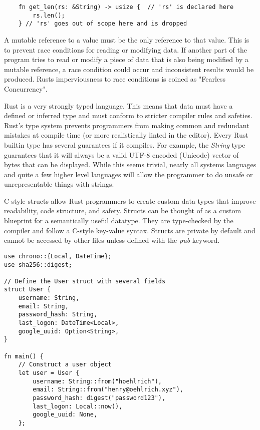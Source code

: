 \documentclass[12pt]{article}
\begin{document}
\begin{flushleft}
\begin{verbatim}
    fn get_len(rs: &String) -> usize {  // 'rs' is declared here
        rs.len();
    } // 'rs' goes out of scope here and is dropped
\end{verbatim}
\doublespacing{}

A mutable reference to a value must be the only reference to that value. This
is to prevent race conditions for reading or modifying data. If another part of
the program tries to read or modify a piece of data that is also being modified
by a mutable reference, a race condition could occur and inconsistent results
would be produced. Rusts imperviousness to race conditions is coined as
"Fearless Concurrency". 


Rust is a very strongly typed language. This means that data must have a
defined or inferred type and must conform to stricter compiler rules and
safeties. Rust's type system prevents programmers from making common and
redundant mistakes at compile time (or more realistically linted in the
editor). Every Rust builtin type has several guarantees if it compiles. For
example, the \textit{String} type guarantees that it will always be a valid
UTF-8 encoded (Unicode) vector of bytes that can be displayed. While this seems
trivial, nearly all systems languages and quite a few higher level languages
will allow the programmer to do unsafe or unrepresentable things with strings.


C-style structs allow Rust programmers to create custom data types that improve
readability, code structure, and safety. Structs can be thought of as a custom
blueprint for a semantically useful datatype. They are type-checked by the
compiler and follow a C-style key-value syntax. Structs are private by default
and cannot be accessed by other files unless defined with the \textit{pub}
keyword.

\singlespacing{}
\begin{verbatim}
use chrono::{Local, DateTime};
use sha256::digest;

// Define the User struct with several fields
struct User {
    username: String,
    email: String,
    password_hash: String,
    last_logon: DateTime<Local>,
    google_uuid: Option<String>,
}

fn main() {
    // Construct a user object
    let user = User {
        username: String::from("hoehlrich"),
        email: String::from("henry@oehlrich.xyz"),
        password_hash: digest("password123"),
        last_logon: Local::now(),
        google_uuid: None,
    };


\end{verbatim}
\end{flushleft}
\end{document}
